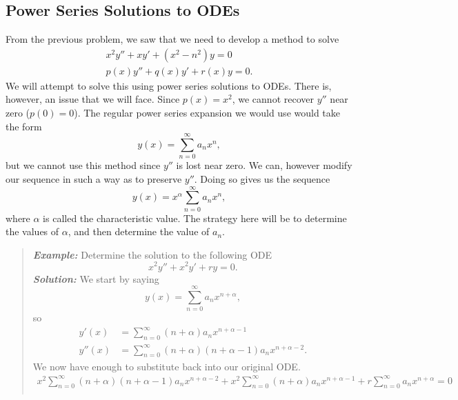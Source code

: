 \subsection{Power Series Solutions to ODEs}

From the previous problem, we saw that we need to develop a method to solve
\begin{gather*}
x^{2}y''+xy'+(x^{2}-n^{2})y = 0\\
p(x)y''+q(x)y'+r(x)y = 0.
\end{gather*}
We will attempt to solve this using power series solutions to ODEs. There is, however, an issue that
we will face. Since $p(x)=x^{2}$, we cannot recover $y''$ near zero ($p(0)=0$). The regular power
series expansion we would use would take the form
\[
y(x) = \sum_{n=0}^{\infty}a_{n}x^{n},
\]
but we cannot use this method since $y''$ is lost near zero. We can, however modify our sequence
in such a way as to preserve $y''$. Doing so gives us the sequence
\[
y(x)=x^{\alpha}\sum_{n=0}^{\infty}a_{n}x^{n},
\]
where $\alpha$ is called the characteristic value. The strategy here will be to determine the values
of $\alpha$, and then determine the value of $a_{n}$.
\begin{quote}
\textbf{\textit{Example:}} Determine the solution to the following ODE
\[
x^{2}y''+x^{2}y'+ry=0.
\]
\textit{\textbf{Solution:}} We start by saying
\[
y(x) = \sum_{n=0}^{\infty}a_{n}x^{n+\alpha},
\]
so
\begin{align*}
y'(x) &= \sum_{n=0}^{\infty}(n+\alpha)a_{n}x^{n+\alpha-1}\\
y''(x) &= \sum_{n=0}^{\infty}(n+\alpha)(n+\alpha-1)a_{n}x^{n+\alpha-2}.
\end{align*}
We now have enough to substitute back into our original ODE.
\begin{gather*}
x^{2}\sum_{n=0}^{\infty}(n+\alpha)(n+\alpha-1)a_{n}x^{n+\alpha-2} +
x^{2}\sum_{n=0}^{\infty}(n+\alpha)a_{n}x^{n+\alpha-1}+
r\sum_{n=0}^{\infty}a_{n}x^{n+\alpha} = 0\\
\end{gather*}
\end{quote}
